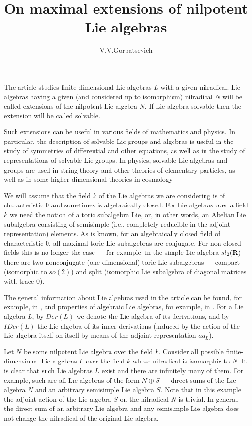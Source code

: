 \documentclass{amsart}
\begin{document}
\thispagestyle{empty}


\title {On maximal extensions of nilpotent Lie algebras}

\author {V.V.Gorbatsevich}

\maketitle

The article studies finite-dimensional Lie algebras $L$ with a given nilradical. Lie algebras having a given (and considered up to isomorphism) nilradical $N$ will be called extensions of the nilpotent Lie algebra $N$. If Lie algebra solvable then the extension will be called solvable.

Such extensions can be useful in various fields of mathematics and physics. In particular, the description of solvable Lie groups and algebras is useful in the study of symmetries of differential and other equations, as well as in the study of representations of solvable Lie groups. In physics, solvable Lie algebras and groups are used in string theory and other theories of elementary particles, as well as in some higher-dimensional theories in cosmology.

We will assume that the field $k$ of the Lie algebras we are considering is of characteristic 0 and sometimes is algebraically closed. For Lie algebras over a field $k$ we need the notion of a toric subalgebra Lie, or, in other words, an Abelian Lie subalgebra consisting of semisimple (i.e., completely reducible in the adjoint representation) elements. As is known, for an algebraically closed field of characteristic 0, all maximal toric Lie subalgebras are conjugate. For non-closed fields this is no longer the case --- for example, in the simple Lie algebra $sl_2(\bf R)$ there are two nonconjugate (one-dimensional) toric Lie subalgebras --- compact (isomorphic to $so(2)$) and split (isomorphic Lie subalgebra of diagonal matrices with trace 0).

The general information about Lie algebras used in the article can be found, for example, in \cite {VGO}, and properties of algebraic Lie algebras, for example, in \cite {H}. For a Lie algebra $L$, by $Der(L)$ we denote the Lie algebra of its derivations, and by $IDer(L)$ the Lie algebra of its inner derivations (induced by the action of the Lie algebra itself on itself by means of the adjoint representation $ad_L$).


Let $N$ be some nilpotent Lie algebra over the field $k$. Consider all possible finite-dimensional Lie algebras $L$ over the field $k$ whose nilradical is isomorphic to $N$. It is clear that such Lie algebras $L$ exist and there are infinitely many of them. For example, such are all Lie algebras of the form $N \oplus S$ --- direct sums of the Lie algebra $N$ and an arbitrary semisimple Lie algebra $S$. Note that in this example the adjoint action of the Lie algebra $S$ on the nilradical $N$ is trivial. In general, the direct sum of an arbitrary Lie algebra and any semisimple Lie algebra does not change the nilradical of the original Lie algebra.
\end{document}
